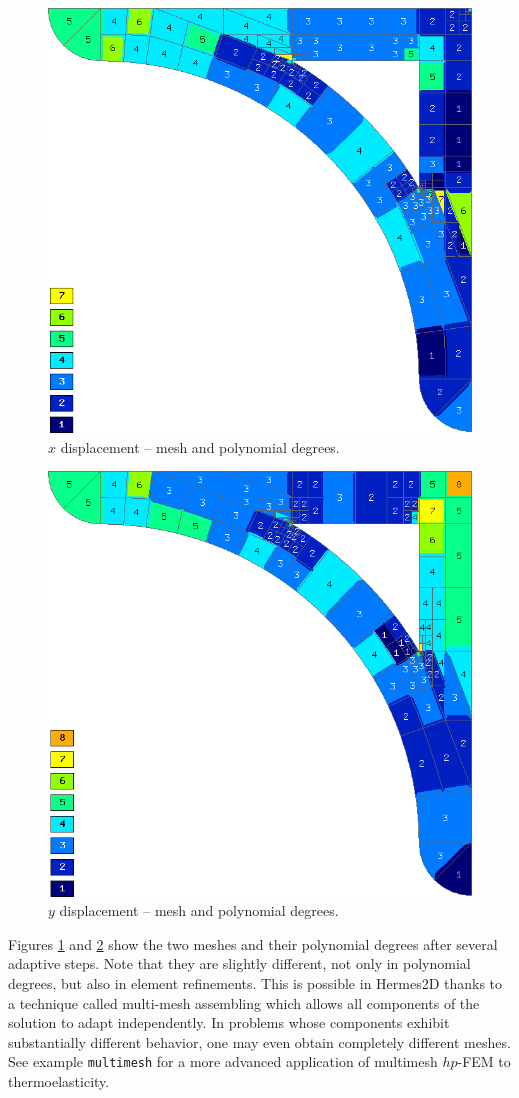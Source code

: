\documentclass[11pt]{article}
\begin{document}
\begin{figure}[!ht]
  \medskip \centering
  \includegraphics[height=0.5\textwidth]{img/sys-xorders.png}
  \caption{$x$ displacement -- mesh and polynomial degrees.}
  \label{fig:sys-xorders}
\end{figure}

\begin{figure}[!ht]
  \medskip \centering
  \includegraphics[height=0.5\textwidth]{img/sys-yorders.png}
  \caption{$y$ displacement -- mesh and polynomial degrees.}
  \label{fig:sys-yorders}
\end{figure}

Figures \ref{fig:sys-xorders} and \ref{fig:sys-yorders} show the two meshes and their polynomial
degrees after several adaptive steps. Note that they are slightly different, not only in
polynomial degrees, but also in element refinements. This is possible in Hermes2D thanks to
a technique called multi-mesh assembling
which allows
all components of the solution to adapt independently. In problems whose components exhibit
substantially different behavior, one may even obtain completely different meshes.
See example {\tt multimesh} for a more advanced application of
multimesh $hp$-FEM to thermoelasticity.
\end{document}
